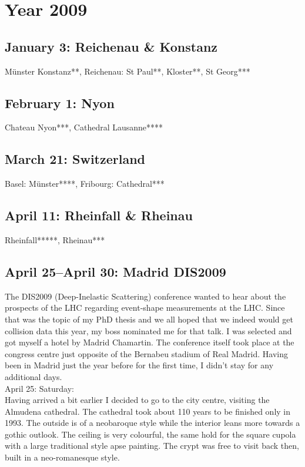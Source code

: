 \chapter{Year 2009}
\label{2009}

\section{January 3: Reichenau \& Konstanz}
\label{2009:Reichenau}

M\"unster Konstanz**, Reichenau: St Paul**, Kloster**, St Georg***

\section{February 1: Nyon}
\label{2009:Nyon}

Chateau Nyon***, Cathedral Lausanne****

\section{March 21: Switzerland}
\label{2009:Switzerland}

Basel: M\"unster****, Fribourg: Cathedral***

\section{April 11: Rheinfall \& Rheinau}
\label{2009:Rheinfall}

Rheinfall*****, Rheinau***

\section{April 25--April 30: Madrid DIS2009}
\label{2009:Madrid}

The DIS2009 (Deep-Inelastic Scattering) conference wanted to hear about the prospects of the LHC regarding event-shape measurements at the LHC. Since that was the topic of my PhD thesis and we all hoped that we indeed would get collision data this year, my boss nominated me for that talk. I was selected and got myself a hotel by Madrid Chamartin. The conference itself took place at the congress centre just opposite of the Bernabeu stadium of Real Madrid. Having been in Madrid just the year before for the first time, I didn't stay for any additional days.\\

April 25: Saturday:\\
Having arrived a bit earlier I decided to go to the city centre, visiting the Almudena cathedral. The cathedral took about 110 years to be finished only in 1993. The outside is of a neobaroque style while the interior leans more towards a gothic outlook. The ceiling is very colourful, the same hold for the square cupola with a large traditional style apse painting. The crypt was free to visit back then, built in a neo-romanesque style.\\

